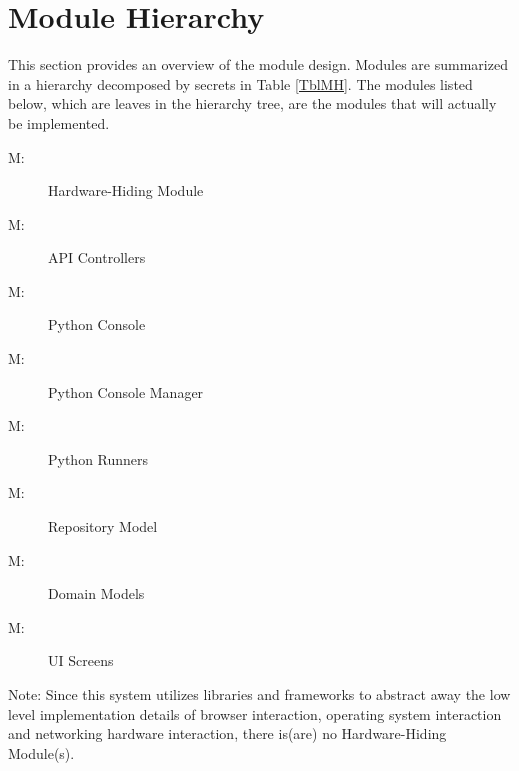 \documentclass[12pt, titlepage]{article}
\newcounter{mnum}
\newcommand{\mthemnum}{M\themnum}
\begin{document}
\section{Module Hierarchy} \label{SecMH}

This section provides an overview of the module design. Modules are summarized
in a hierarchy decomposed by secrets in Table \ref{TblMH}. The modules listed
below, which are leaves in the hierarchy tree, are the modules that will
actually be implemented.

\begin{description}
\item [ \mthemnum \label{mHH}:] Hardware-Hiding Module
\item [ \mthemnum \label{mHH}:] API Controllers
\item [ \mthemnum \label{mHH}:] Python Console
\item [ \mthemnum \label{mHH}:] Python Console Manager
\item [ \mthemnum \label{mHH}:] Python Runners
\item [ \mthemnum \label{mHH}:] Repository Model
\item [ \mthemnum \label{mHH}:] Domain Models
\item [ \mthemnum \label{mHH}:] UI Screens
\end{description}

Note: Since this system utilizes libraries and frameworks to abstract away the
low level implementation details of browser interaction, operating system
interaction and networking hardware interaction, there is(are) no
Hardware-Hiding Module(s).
\end{document}
